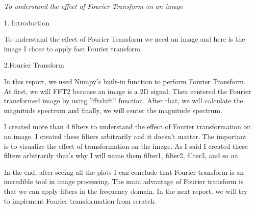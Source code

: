 \documentclass[a4paper]{article}
\begin{document}
  
\begin{center}  
\begin{huge}  
\textit{ To understand the effect of Fourier
Transform on an image}\\  
\end{huge}  
  
\end{center}  
  
1. Introduction

To understand the effect of Fourier Transform we need an image and here is the image I
chose to apply fast Fourier transform.

2.Fourier Transform

In this report, we used Numpy’s built-in function to perform Fourier Transform. At first,
we will FFT2 because an image is a 2D signal. Then centered the Fourier transformed
image by using ”fftshift” function. After that, we will calculate the magnitude spectrum
and finally, we will center the magnitude spectrum.


I created more than 4 filters to understand the effect of Fourier transformation on an
image. I created these filters arbitrarily and it doesn’t matter. The important is to
visualize the effect of transformation on the image. As I said I created these filters
arbitrarily that’s why I will name them filter1, filter2, filter3, and so on.


In the end, after seeing all the plots I can conclude that Fourier transform is an incredible
tool in image processing. The main advantage of Fourier transform is that we can apply
filters in the frequency domain. In the next report, we will try to implement Fourier
transformation from scratch.
\end{document}
